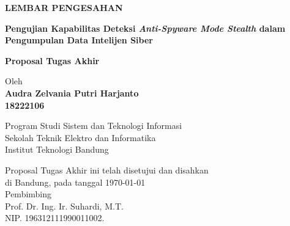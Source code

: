 \documentclass[12pt,a4paper,oneside]{book}
\begin{document}
\newpage
\thispagestyle{empty}
\begin{center}
  \textbf{\large LEMBAR PENGESAHAN}\\[1cm]
  \vspace*{1.5cm}
    
  {\large\bfseries Pengujian Kapabilitas Deteksi \textit{Anti-Spyware Mode Stealth} dalam Pengumpulan Data Intelijen Siber}\\
     \vspace{2cm}

  {\Large \textbf{Proposal Tugas Akhir}}\\


  \vspace{1.5cm}
    
    
  {\large Oleh}\\[0.3cm]
    \textbf{
    {\large Audra Zelvania Putri Harjanto}\\
    {\large 18222106}
  }\\
    
  \vspace{0.5cm}
 
  {\large Program Studi Sistem dan Teknologi Informasi}\\
  {\large Sekolah Teknik Elektro dan Informatika}\\
  {\large Institut Teknologi Bandung}\\

  \vspace{1.5cm}

  Proposal Tugas Akhir ini telah disetujui dan disahkan\\ 
  di Bandung, pada tanggal \today\\[1cm]

	Pembimbing  \\[3cm]
	Prof. Dr. Ing. Ir. Suhardi, M.T.   \\[0.2cm]
	NIP. 196312111990011002. 

\end{center}

\vspace{1cm}
\noindent

\end{document}
